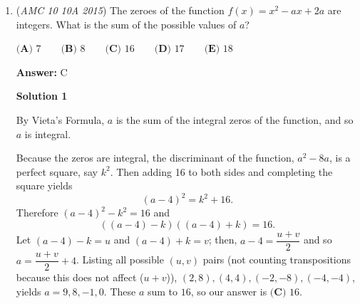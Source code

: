 \begin{enumerate}
 \textbf{Step 6: Intersections of six pairs}There are $\dbinom{8}{6} = 28$ choices:

 
            \begin{itemize}
        \item Chain of 6 pairs (forces 7 people): $8 \times 2^1 = 16$.
        \item Configurations forcing all 8 people: $20 \times 2^0 = 20$.
            \end{itemize}
            Summing these gives $16 + 20 = 36$.

 \textbf{Step 7: Intersections of seven pairs}There are $\dbinom{8}{7} = 8$ choices. Any combination of 7 pairs forms an open chain that wraps almost completely around the table, meaning all $8$ people are forced to stand. 
 \[8 \times 2^0 = 8\]

 \textbf{Step 8: Intersection of all eight pairs}There is $\dbinom{8}{8} = 1$ choice, which forms the complete closed circle and forces all 8 people to stand.
 \[1 \times 2^0 = 1\]

 \textbf{Piecing it together:}Using the alternating signs required by PIE, the total count of distinct bad configurations is:
 \[\text{Bad Configurations} = 512 - 576 + 448 - 258 + 112 - 36 + 8 - 1 = 209\]

 Subtracting these invalid outcomes from our initial total pool yields the number of successful valid configurations:
 \[\text{Valid Configurations} = 256 - 209 = 47\]

 Thus, the probability that no two adjacent people stand up is $\boxed{\textbf{(A) } \dfrac{47}{256}}$.

 


	\item (\textit{AMC 10 10A 2015}) The zeroes of the function $f(x)=x^2-ax+2a$ are integers. What is the sum of the possible values of $a$?


 $\textbf{(A) }7\qquad\textbf{(B) }8\qquad\textbf{(C) }16\qquad\textbf{(D) }17\qquad\textbf{(E) }18$

 \textbf{Answer: }C



\textbf{Solution 1}

By Vieta's Formula, $a$ is the sum of the integral zeros of the function, and so $a$ is integral.

 Because the zeros are integral, the discriminant of the function, $a^2 - 8a$, is a perfect square, say $k^2$. Then adding 16 to both sides and completing the square yields
 \[(a - 4)^2 = k^2 + 16.\]Therefore $(a-4)^2 - k^2 = 16$ and
 \[((a-4) - k)((a-4) + k) = 16.\]Let $(a-4) - k = u$ and $(a-4) + k = v$; then, $a-4 = \dfrac{u+v}{2}$ and so $a = \dfrac{u+v}{2} + 4$. Listing all possible $(u, v)$ pairs (not counting transpositions because this does not affect ($u + v$)), $(2, 8), (4, 4), (-2, -8), (-4, -4)$, yields $a = 9, 8, -1, 0$. These $a$ sum to $16$, so our answer is $\boxed{\textbf{(C) }16}$.


\end{enumerate}
